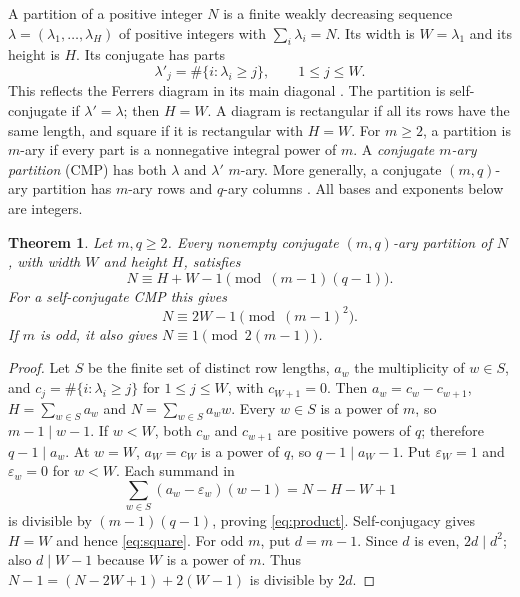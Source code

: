 \documentclass[11pt]{article}
\newtheorem{theorem}{Theorem}
\begin{document}
A partition of a positive integer $N$ is a finite weakly decreasing
sequence $\lambda=(\lambda_1,\ldots,\lambda_H)$ of positive integers with
$\sum_i\lambda_i=N$. Its width is $W=\lambda_1$ and its height is $H$.
Its conjugate has parts
\[
 \lambda'_j=\#\{i:\lambda_i\geq j\},\qquad 1\leq j\leq W.
\]
This reflects the Ferrers diagram in its main diagonal
\cite[\S26.9(i)]{DLMF}. The partition is self-conjugate if
$\lambda'=\lambda$; then $H=W$. A diagram is rectangular if all its rows
have the same length, and square if it is rectangular with $H=W$.
For $m\geq2$, a partition is $m$-ary if every part is a nonnegative
integral power of $m$. A \emph{conjugate $m$-ary partition} (CMP) has both
$\lambda$ and $\lambda'$ $m$-ary. More generally, a conjugate $(m,q)$-ary
partition has $m$-ary rows and $q$-ary columns
\cite[Definitions~1.1--1.2]{DFL}. All bases and exponents below are integers.

\begin{theorem}\label{thm:product}
Let $m,q\geq2$. Every nonempty conjugate $(m,q)$-ary partition of $N$,
with width $W$ and height $H$, satisfies
\begin{equation}\label{eq:product}
 N\equiv H+W-1\pmod{(m-1)(q-1)}.
\end{equation}
For a self-conjugate CMP this gives
\begin{equation}\label{eq:square}
 N\equiv 2W-1\pmod{(m-1)^2}.
\end{equation}
If $m$ is odd, it also gives $N\equiv1\pmod{2(m-1)}$.
\end{theorem}
\begin{proof}
Let $S$ be the finite set of distinct row lengths, $a_w$ the multiplicity
of $w\in S$, and $c_j=\#\{i:\lambda_i\geq j\}$ for $1\leq j\leq W$,
with $c_{W+1}=0$. Then $a_w=c_w-c_{w+1}$,
$H=\sum_{w\in S}a_w$ and $N=\sum_{w\in S}a_ww$.
Every $w\in S$ is a power of $m$, so $m-1\mid w-1$.
If $w<W$, both $c_w$ and $c_{w+1}$ are positive powers of $q$;
therefore $q-1\mid a_w$. At $w=W$, $a_W=c_W$ is a power of $q$,
so $q-1\mid a_W-1$. Put $\varepsilon_W=1$ and
$\varepsilon_w=0$ for $w<W$. Each summand in
\[
 \sum_{w\in S}(a_w-\varepsilon_w)(w-1)
 =N-H-W+1
\]
is divisible by $(m-1)(q-1)$, proving \eqref{eq:product}.
Self-conjugacy gives $H=W$ and hence \eqref{eq:square}.
For odd $m$, put $d=m-1$. Since $d$ is even, $2d\mid d^2$;
also $d\mid W-1$ because $W$ is a power of $m$.
Thus $N-1=(N-2W+1)+2(W-1)$ is divisible by $2d$.
\end{proof}
\end{document}
